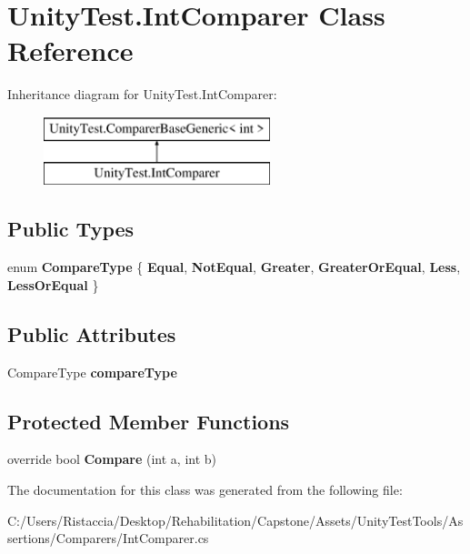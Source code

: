 \hypertarget{class_unity_test_1_1_int_comparer}{}\section{Unity\+Test.\+Int\+Comparer Class Reference}
\label{class_unity_test_1_1_int_comparer}
Inheritance diagram for Unity\+Test.\+Int\+Comparer\+:\begin{figure}[H]
\begin{center}
\leavevmode
\includegraphics[height=2.000000cm]{class_unity_test_1_1_int_comparer}
\end{center}
\end{figure}
\subsection*{Public Types}
\begin{DoxyCompactItemize}
\item 
\mbox{\label{class_unity_test_1_1_int_comparer_a6b8cd1c3bab3e30db16f869788656b17}} 
enum {\bfseries Compare\+Type} \{ \newline
{\bfseries Equal}, 
{\bfseries Not\+Equal}, 
{\bfseries Greater}, 
{\bfseries Greater\+Or\+Equal}, 
\newline
{\bfseries Less}, 
{\bfseries Less\+Or\+Equal}
 \}
\end{DoxyCompactItemize}
\subsection*{Public Attributes}
\begin{DoxyCompactItemize}
\item 
\mbox{\label{class_unity_test_1_1_int_comparer_a5df2b49e542ee2aa09a04060fbffab8a}} 
Compare\+Type {\bfseries compare\+Type}
\end{DoxyCompactItemize}
\subsection*{Protected Member Functions}
\begin{DoxyCompactItemize}
\item 
\mbox{\label{class_unity_test_1_1_int_comparer_a890d014fd39cf86817c6f4861ce01e71}} 
override bool {\bfseries Compare} (int a, int b)
\end{DoxyCompactItemize}


The documentation for this class was generated from the following file\+:\begin{DoxyCompactItemize}
\item 
C\+:/\+Users/\+Ristaccia/\+Desktop/\+Rehabilitation/\+Capstone/\+Assets/\+Unity\+Test\+Tools/\+Assertions/\+Comparers/Int\+Comparer.\+cs\end{DoxyCompactItemize}

